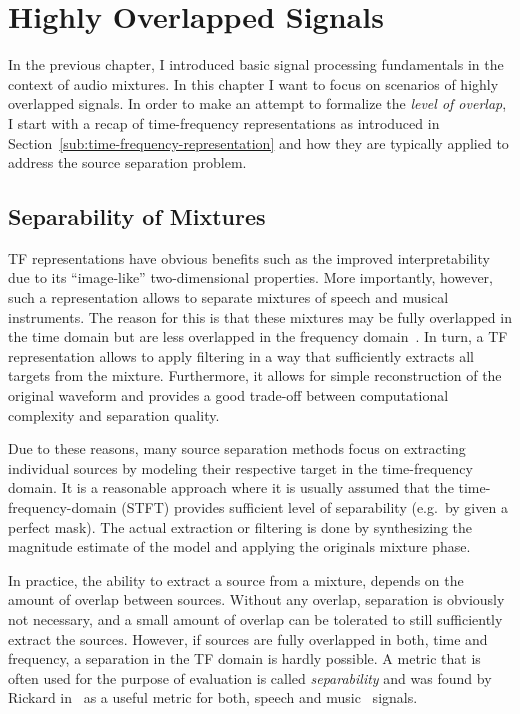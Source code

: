 \hypertarget{highly-overlapped-signals}{%
\chapter{Highly Overlapped Signals}\label{cha:highly-overlapped-signals}}

In the previous chapter, I introduced basic signal processing fundamentals in the context of audio mixtures.
In this chapter I want to focus on scenarios of highly overlapped signals.
In order to make an attempt to formalize the \emph{level of overlap}, I start with a recap of time-frequency representations as introduced in Section~\ref{sub:time-frequency-representation} and how they are typically applied to address the source separation problem.

\hypertarget{separability-of-mixtures}{%
\section{Separability of Mixtures}\label{separability-of-mixtures}}

TF representations have obvious benefits such as the improved interpretability due to its ``image-like'' two-dimensional properties.
More importantly, however, such a representation allows to separate mixtures of speech and musical instruments.
The reason for this is that these mixtures may be fully overlapped in the time domain but are less overlapped in the frequency domain~\cite{rickard02, giannoulis11, rafii}.
In turn, a TF representation allows to apply filtering in a way that sufficiently extracts all targets from the mixture.
Furthermore, it allows for simple reconstruction of the original waveform and provides a good trade-off between computational complexity and separation quality.
\par
Due to these reasons, many source separation methods focus on extracting individual sources by modeling their respective target in the time-frequency domain.
It is a reasonable approach where it is usually assumed that the time-frequency-domain (STFT) provides sufficient level of separability (e.g.~by given a perfect mask).
The actual extraction or filtering is done by synthesizing the magnitude estimate of the model and applying the originals mixture phase.
\par
In practice, the ability to extract a source from a mixture, depends on the amount of overlap between sources.
Without any overlap, separation is obviously not necessary, and a small amount of overlap can be tolerated to still sufficiently extract the sources.
However, if sources are fully overlapped in both, time and frequency, a separation in the TF domain is hardly possible.
A metric that is often used for the purpose of evaluation is called \emph{separability} and was found by Rickard in~\cite{rickard02} as a useful metric for both, speech and music~\cite{giannoulis11} signals.
\par


